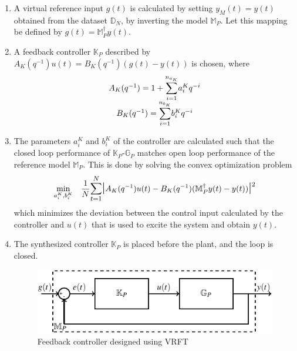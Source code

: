 \documentclass[letterpaper, 10 pt, conference]{ieeeconf}  %
\begin{document}
\begin{enumerate}
	\item
	A virtual reference input $g(t)$ is calculated by setting $y_M(t)=y(t)$ obtained from the dataset $\mathbb{D}_N$, by inverting the model $\mathbb{M}_P$. Let this mapping be defined by $g(t) = \mathbb{M}_P^{\dagger}y(t) $.
	\item
	A feedback controller $\mathbb{K}_P$ described by $A_K(q^{-1})u(t) = B_K(q^{-1})(g(t)-y(t))$ is chosen, where 
	\begin{equation*}
	\begin{matrix}
	A_K(q^{-1}) = 1+\mathlarger{\sum\limits_{i=1}^{n_{a_K}}}a_i^Kq^{-i}\\
	B_K(q^{-1}) = \mathlarger{\sum\limits_{i=1}^{n_{b_K}}}b_i^Kq^{-i}
	\end{matrix}  
	\end{equation*}
	\item
		The parameters $a_i^K$ and $b_i^K$  of the controller are calculated such that the closed loop performance of $\mathbb{K}_P$-$\mathbb{G}_P$ matches open loop performance of  the reference model $\mathbb{M}_P$.
	This is done by solving the convex optimization problem
	\begin{equation}
	\begin{aligned}
	& \underset{a_i^K,b_i^K}{\text{min}}
	& & \frac{1}{N}\mathlarger{\sum\limits_{t=1}^N}\mathlarger{\mathlarger{|}}A_K(q^{-1})u(t)-B_K(q^{-1})(\mathbb{M}_P^{\dagger}y(t)-y(t))\mathlarger{\mathlarger{|}}^2 \\
	\end{aligned}
	\label{VRFT_problem}
	\end{equation}
	which minimizes the deviation between the control input calculated by the controller and $u(t)$ that is used to excite the system and obtain $y(t)$.
	\item
	The synthesized controller $\mathbb{K}_P$ is placed before the plant, and the loop is closed.
	\begin{figure}[h]
		\hspace{30pt}
	\includegraphics[scale=0.8]{KpGp.pdf}
	\caption{Feedback controller designed using VRFT}
	\end{figure}
\end{enumerate}
\end{document}
